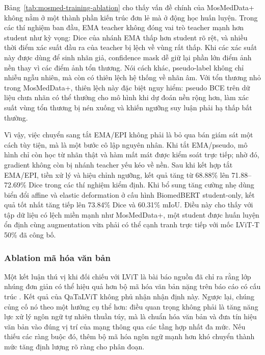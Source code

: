 Bảng~\ref{tab:mosmed-training-ablation} cho thấy vấn đề chính của MosMedData+ không nằm ở một thành phần kiến trúc đơn lẻ mà ở động học huấn luyện. Trong các thí nghiệm ban đầu, EMA teacher không đóng vai trò teacher mạnh hơn student như kỳ vọng: Dice của nhánh EMA thấp hơn student rõ rệt, và nhiều thời điểm xác suất đầu ra của teacher bị lệch về vùng rất thấp. Khi các xác suất này được dùng để sinh nhãn giả, confidence mask dễ giữ lại phần lớn điểm ảnh nền thay vì các điểm ảnh tổn thương. Nói cách khác, pseudo-label không chỉ nhiễu ngẫu nhiên, mà còn có thiên lệch hệ thống về nhãn âm. Với tổn thương nhỏ trong MosMedData+, thiên lệch này đặc biệt nguy hiểm: pseudo BCE trên dữ liệu chưa nhãn có thể thưởng cho mô hình khi dự đoán nền rộng hơn, làm xác suất vùng tổn thương bị nén xuống và khiến ngưỡng suy luận phải hạ thấp bất thường.

Vì vậy, việc chuyển sang tắt EMA/EPI không phải là bỏ qua bán giám sát một cách tùy tiện, mà là một bước cô lập nguyên nhân. Khi tắt EMA/pseudo, mô hình chỉ còn học từ nhãn thật và hàm mất mát được kiểm soát trực tiếp; nhờ đó, gradient không còn bị nhánh teacher yếu kéo về nền. Sau khi kết hợp tắt EMA/EPI, tiền xử lý và hiệu chỉnh ngưỡng, kết quả tăng từ 68.88\% lên 71.88--72.69\% Dice trong các thí nghiệm kiểm định. Khi bổ sung tăng cường nhẹ dùng biển đổi affine và elastic deformation ở cấu hình BiomedBERT student-only, kết quả tốt nhất tăng tiếp lên 73.84\% Dice và 60.31\% mIoU. Điều này cho thấy với tập dữ liệu có lệch miền mạnh như MosMedData+, một student được huấn luyện ổn định cùng augmentation vừa phải có thể cạnh tranh trực tiếp với mốc LViT-T 50\% đã công bố.

\subsubsection{Ablation mã hóa văn bản}
\label{sec:text-encoding}

Một kết luận thú vị khi đối chiếu với LViT là bài báo nguồn đã chỉ ra rằng lớp nhúng đơn giản có thể hiệu quả hơn bộ mã hóa văn bản nặng trên báo cáo có cấu trúc \cite{li2023lvit}. Kết quả của QaTaLViT không phủ nhận nhận định này. Ngược lại, chúng củng cố nó theo một hướng cụ thể hơn: điều quan trọng không phải là tăng năng lực xử lý ngôn ngữ tự nhiên thuần túy, mà là chuẩn hóa văn bản và đưa tín hiệu văn bản vào đúng vị trí của mạng thông qua các tầng hợp nhất đa mức. Nếu thiếu các ràng buộc đó, thêm bộ mã hóa ngôn ngữ mạnh hơn khó chuyển thành mức tăng định lượng rõ ràng cho phân đoạn.

